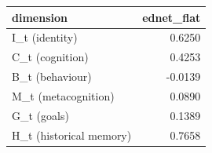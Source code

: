 \begin{tabular}{lr}
\toprule
dimension & ednet\_flat \\
\midrule
I\_t (identity) & 0.6250 \\
C\_t (cognition) & 0.4253 \\
B\_t (behaviour) & -0.0139 \\
M\_t (metacognition) & 0.0890 \\
G\_t (goals) & 0.1389 \\
H\_t (historical memory) & 0.7658 \\
\bottomrule
\end{tabular}
